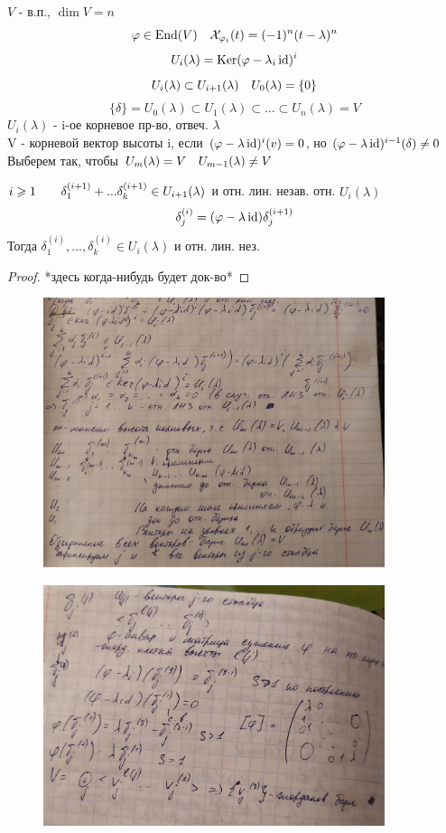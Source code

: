 \documentclass[algebra]{subfiles}
\begin{document}
    $V$ - в.п., $\dim V = n$
    \[\varphi \in \mathop{\rm End}\nolimits(V) \quad \mathcal{X}_{\varphi_i}(t) = (-1)^n (t - \lambda)^n\]
    \[U_i(\lambda) = \mathop{\rm Ker}\nolimits(\varphi - \lambda_i \mathop{\rm id}\nolimits)^i\]
    \[U_i(\lambda) \subset U_{i+1}(\lambda) \quad U_0(\lambda) = \{0\}\]
    \[\{\delta\} = U_0(\lambda) \subset U_1(\lambda) \subset ... \subset U_n(\lambda) = V\]
    $U_i(\lambda)$ - i-ое корневое пр-во, отвеч. $\lambda$\\
    V - корневой вектор высоты i, если $(\varphi - \lambda \mathop{\rm id}\nolimits)^i (v) = 0$, но $(\varphi - \lambda \mathop{\rm id}\nolimits)^{i-1} (\delta) \neq 0$\\
    Выберем так, чтобы $U_m(\lambda) = V \quad U_{m-1}(\lambda) \neq V$

    \begin{lemma}[1]
        $i \geqslant 1 \qquad \delta_1^{(i+1)} + ... \delta_k^{(i+1)} \in U_{i+1}(\lambda)$ и отн. лин. незав. отн. $U_i(\lambda)$
        \[\delta_j^{(i)} = (\varphi - \lambda \mathop{\rm id}\nolimits) \delta_j^{(i+1)}\]
        Тогда $\delta_1^{(i)},...,\delta_k^{(i)} \in U_i(\lambda)$ и отн. лин. нез.
    \end{lemma}

    \begin{proof}
      *здесь когда-нибудь будет док-во*
    \end{proof}

    \begin{figure}[H]
            \includegraphics[width=10cm]{pics/l60_1}
            \centering
    \end{figure}

    \begin{figure}[H]
            \includegraphics[width=10cm]{pics/l60_2}
            \centering
    \end{figure}
\end{document}
